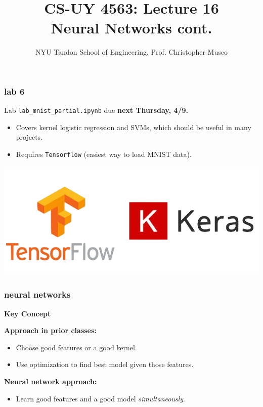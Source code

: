 \documentclass[handout,compress]{beamer}
\title{CS-UY 4563: Lecture 16 \\ Neural Networks cont.}
\author{NYU Tandon School of Engineering, Prof. Christopher Musco}
\date{}
\begin{document}
\begin{frame}
	\titlepage 
\end{frame}


\begin{frame}
	\frametitle{lab 6}
	\begin{center}
	Lab \texttt{lab\_mnist\_partial.ipynb} due \textbf{next Thursday, 4/9.}
	\end{center}
	\begin{itemize}
		\item Covers kernel logistic regression and SVMs, which should be useful in many projects. 
		\item Requires \texttt{Tensorflow} (easiest way to load MNIST data). 
	\end{itemize}
\vspace{-1em}
	\begin{center}
	\includegraphics[width=.5\textwidth]{kerastf.png}
\end{center}
\end{frame}

\begin{frame}
	\frametitle{neural networks}	
	\begin{center}
		\textbf{\alert{Key Concept}}
	\end{center}
	\textbf{Approach in prior classes:}
	\begin{itemize}
		\item Choose good features or a good kernel. 
		\item Use optimization to find best model given those features. 
	\end{itemize}
	\textbf{Neural network approach:}
\begin{itemize}
	\item Learn good features and a good model \emph{simultaneously}. 
\end{itemize}
\end{frame}
\end{document}
